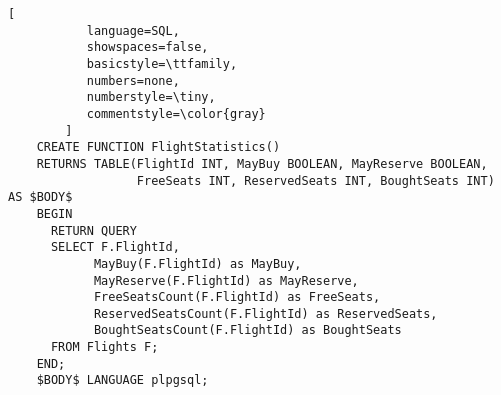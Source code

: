 \documentclass[11pt,a4paper,oneside]{article}
\begin{document}
\begin{lstlisting}[
           language=SQL,
           showspaces=false,
           basicstyle=\ttfamily,
           numbers=none,
           numberstyle=\tiny,
           commentstyle=\color{gray}
        ]
    CREATE FUNCTION FlightStatistics()
    RETURNS TABLE(FlightId INT, MayBuy BOOLEAN, MayReserve BOOLEAN, 
                  FreeSeats INT, ReservedSeats INT, BoughtSeats INT) AS $BODY$
    BEGIN
      RETURN QUERY
      SELECT F.FlightId, 
            MayBuy(F.FlightId) as MayBuy,
            MayReserve(F.FlightId) as MayReserve,
            FreeSeatsCount(F.FlightId) as FreeSeats,
            ReservedSeatsCount(F.FlightId) as ReservedSeats,
            BoughtSeatsCount(F.FlightId) as BoughtSeats
      FROM Flights F;
    END;
    $BODY$ LANGUAGE plpgsql;
\end{lstlisting}
\end{document}
